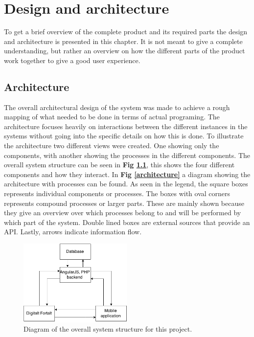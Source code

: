 
\chapter{Design and architecture}

To get a brief overview of the complete product and its required parts the design and architecture is presented in this chapter. It is not meant to give a complete understanding, but rather an overview on how the different parts of the product work together to give a good user experience.

\section{Architecture}

The overall architectural design of the system was made to achieve a rough mapping of what needed to be done in terms of actual programing. The architecture focuses heavily on interactions between the different instances in the systems without going into the specific details on how this is done. To illustrate the architecture two different views were created. One showing only the components, with another showing the processes in the different components. The overall system structure can be seen in \textbf{Fig \ref{system_structure}}, this shows the four different components and how they interact. In \textbf{Fig \ref{architecture}} a diagram showing the architecture with processes can be found. As seen in the legend, the square boxes represents individual components or processes. The boxes with oval corners represents compound processes or larger parts. These are mainly shown because they give an overview over which processes belong to and will be performed by which part of the system. Double lined boxes are external sources that provide an API. Lastly, arrows indicate information flow.

\begin{figure}[h!]
	\centering
	\includegraphics[width=0.5\textwidth]{fig/system_structure}
	\caption{Diagram of the overall system structure for this project.}
	\label{system_structure}
\end{figure}

